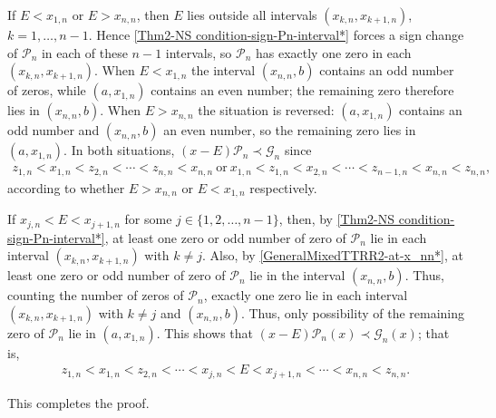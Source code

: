 \documentclass[final,3p,times,12pt]{elsarticle}
\numberwithin{equation}{section}  %
\begin{document}
If $E < x_{1,n}$ or $E > x_{n,n}$, then $E$ lies outside all intervals $(x_{k,n},x_{k+1,n})$, $k=1,\dots,n-1$. Hence \eqref{Thm2-NS condition-sign-Pn-interval*} forces a sign change of $\mathcal{P}_n$ in each of these $n-1$ intervals, so $\mathcal{P}_n$ has exactly one zero in each $(x_{k,n},x_{k+1,n})$.  
When $E < x_{1,n}$ the interval $(x_{n,n},b)$ contains an odd number of zeros, while $(a,x_{1,n})$ contains an even number; the remaining zero therefore lies in $(x_{n,n},b)$.  
When $E > x_{n,n}$ the situation is reversed: $(a,x_{1,n})$ contains an odd number and $(x_{n,n},b)$ an even number, so the remaining zero lies in $(a,x_{1,n})$.  
In both situations,  $(x-E)\mathcal{P}_n\prec \mathcal{G}_n$ since
\begin{align*}
	z_{1,n} < x_{1,n} < z_{2,n} < \cdots < z_{n,n} < x_{n,n}	~\text{or}~	x_{1,n} < z_{1,n} < x_{2,n}  < \cdots < z_{n-1,n} < x_{n,n} < z_{n,n},
\end{align*}
according to whether $E > x_{n,n}$ or $E < x_{1,n}$ respectively.



If $x_{j,n} < E < x_{j+1,n}$ for some $j \in \{1, 2, \ldots, n-1\}$, then, by \eqref{Thm2-NS condition-sign-Pn-interval*}, at least one zero or odd number of zero of $\mathcal{P}_n$ lie in each interval $(x_{k,n}, x_{k+1,n})$ with $k \neq j$. Also, by \eqref{GeneralMixedTTRR2-at-x_nn*}, at least one zero or odd number of zero of  $\mathcal{P}_n$ lie in the interval $(x_{n,n},b)$. Thus, counting the number of zeros of $\mathcal{P}_n$, exactly one zero lie in each interval $(x_{k,n}, x_{k+1,n})$ with $k \neq j$ and $(x_{n,n},b)$. Thus, only possibility of the remaining zero of $\mathcal{P}_n$ lie in $(a,x_{1,n})$. This shows that $(x-E)\mathcal{P}_n(x)\prec \mathcal{G}_n(x)$; that is,
\begin{align*}
	z_{1,n} < x_{1,n} < z_{2,n} < \cdots < x_{j,n} < E  < x_{j+1,n} < \cdots < x_{n,n} < z_{n,n}.
\end{align*}

This completes the proof.
\vspace{1cm} 
\end{document}
